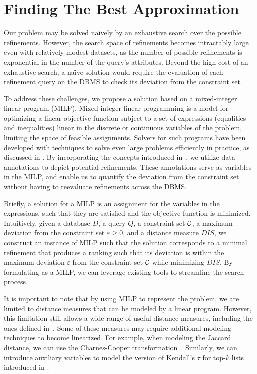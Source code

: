 \section{Finding The Best Approximation}
\label{sec:search}

Our problem may be solved na\"{\i}vely by an exhaustive search over the possible refinements. However, the search space of refinements becomes intractably large even with relatively modest datasets, as the number of possible refinements is exponential in the number of the query's attributes.
Beyond the high cost of an exhaustive search, a na\"{\i}ve solution would require the evaluation of each refinement query on the DBMS to check its deviation from the constraint set. 

To address these challenges, we propose a solution based on a mixed-integer linear program (MILP). Mixed-integer linear programming is a model for optimizing a linear objective function subject to a set of expressions (equalities and inequalities) linear in the discrete or continuous variables of the problem, limiting the space of feasible assignments. Solvers for such programs have been developed with techniques to solve even large problems efficiently in practice, as discussed in \cite{QFix}.
By incorporating the concepts introduced in~\cite{MLJ22, ERICA}, we utilize data annotations to depict potential refinements. These annotations serve as variables in the MILP, and enable us to quantify the deviation from the constraint set without having to reevaluate refinements across the DBMS.

Briefly, a solution for a MILP is an assignment for the variables in the expressions, such that they are satisfied and the objective function is minimized. 
Intuitively, given a database $D$, a query $Q$, a constraint set $\mathcal{C}$, a maximum deviation from the constraint set $\varepsilon \geq 0$, and a distance measure $DIS$, we construct an instance of MILP such that the solution corresponds to a minimal refinement that produces a ranking such that its deviation is within the maximum deviation $\varepsilon$ from the constraint set $\mathcal{C}$ while minimizing $DIS$.
By formulating \problem{} as a MILP, we can leverage existing tools to streamline the search process. 


It is important to note that by using MILP to represent the problem, we are limited to distance measures that can be modeled by a linear program. However, this limitation still allows a wide range of useful distance measures, including the ones defined in~. Some of these measures may require additional modeling techniques to become linearized. For example, when modeling the Jaccard distance, we can use the Charnes-Cooper transformation~\cite{CC62}. Similarly, we can introduce auxiliary  variables to model the version of Kendall's $\tau$ for top-$k$ lists introduced in \cite{FKS03}. %

